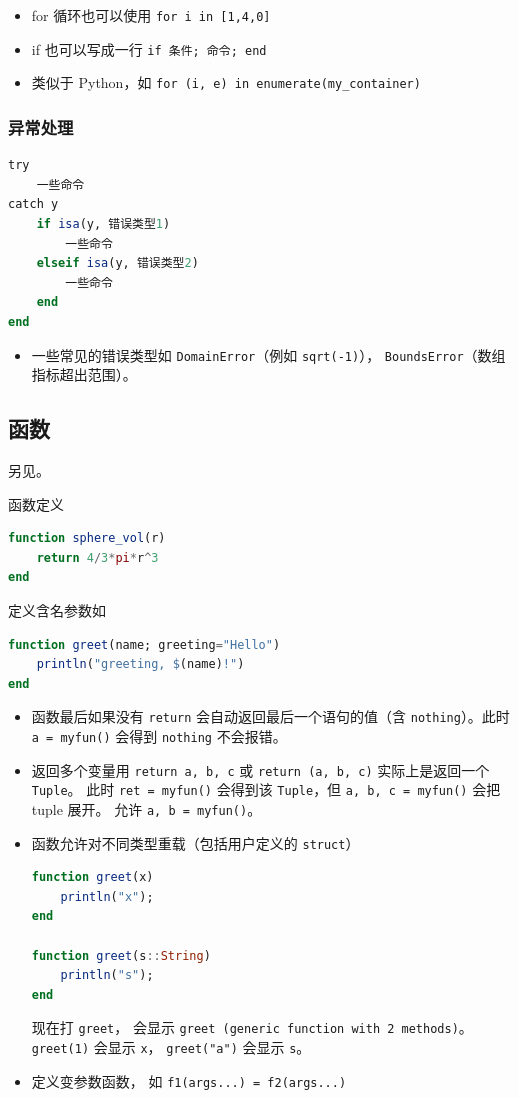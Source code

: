 \begin{itemize}
\item for 循环也可以使用 \verb`for i in [1,4,0]`
\item if 也可以写成一行 \verb`if 条件; 命令; end`
\item 类似于 Python，如 \verb`for (i, e) in enumerate(my_container)`
\end{itemize}

\subsubsection{异常处理}
\begin{lstlisting}[language=julia]
try 
    一些命令
catch y
    if isa(y, 错误类型1)
        一些命令
    elseif isa(y, 错误类型2)
        一些命令
    end
end
\end{lstlisting}
\begin{itemize}
\item 一些常见的错误类型如 \verb`DomainError`（例如 \verb`sqrt(-1)`）， \verb`BoundsError`（数组指标超出范围）。
\end{itemize}

\subsection{函数}

另见。

函数定义
\begin{lstlisting}[language=julia]
function sphere_vol(r)
    return 4/3*pi*r^3
end
\end{lstlisting}

定义含名参数如
\begin{lstlisting}[language=julia]
function greet(name; greeting="Hello")
    println("greeting, $(name)!")
end
\end{lstlisting}

\begin{itemize}
\item 函数最后如果没有 \verb`return` 会自动返回最后一个语句的值（含 \verb`nothing`）。此时 \verb`a = myfun()` 会得到 \verb`nothing` 不会报错。
\item 返回多个变量用 \verb`return a, b, c` 或 \verb`return (a, b, c)` 实际上是返回一个 \verb`Tuple`。 此时 \verb`ret = myfun()` 会得到该 \verb`Tuple`，但 \verb`a, b, c = myfun()` 会把 tuple 展开。 允许 \verb`a, b = myfun()`。
\item 函数允许对不同类型重载（包括用户定义的 \verb`struct`）
\begin{lstlisting}[language=julia]
function greet(x)
    println("x");
end

function greet(s::String)
    println("s");
end
\end{lstlisting}
现在打 \verb`greet`， 会显示 \verb`greet (generic function with 2 methods)`。 \verb`greet(1)` 会显示 \verb`x`， \verb`greet("a")` 会显示 \verb`s`。
\item 定义变参数函数， 如 \verb`f1(args...) = f2(args...)`
\end{itemize}

